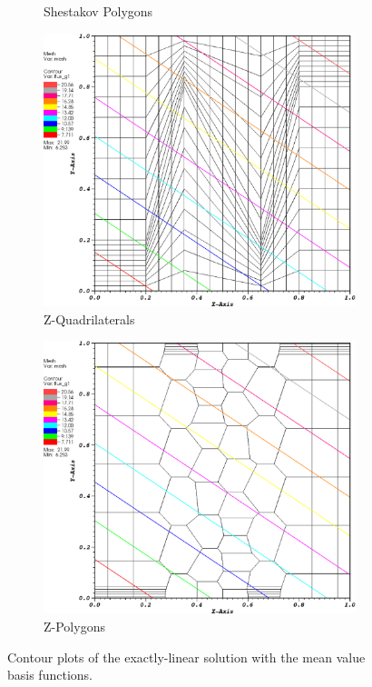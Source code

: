 \begin{figure}
{\begin{subfigure}[b]{0.45\textwidth}
		\caption{Shestakov Polygons}
	\end{subfigure}
}
\vspace{3mm}
{
	\begin{subfigure}[b]{0.45\textwidth}
		\centering
		\label{subfig::z_quad_mv_lin_sol}
		\includegraphics[width=\textwidth]{figures/sec_BF/z_quad_MV_k1.eps}
		\caption{Z-Quadrilaterals}
	\end{subfigure}
	\hfill
	\begin{subfigure}[b]{0.45\textwidth}
		\centering
		\label{subfig::z_poly_mv_lin_sol}
		\includegraphics[width=\textwidth]{figures/sec_BF/z_poly_MV_k1.eps}
		\caption{Z-Polygons}
	\end{subfigure}
}
\caption{Contour plots of the exactly-linear solution with the mean value basis functions.}
\label{fig::BF_Results_Linear_mv_sol}
\end{figure}

